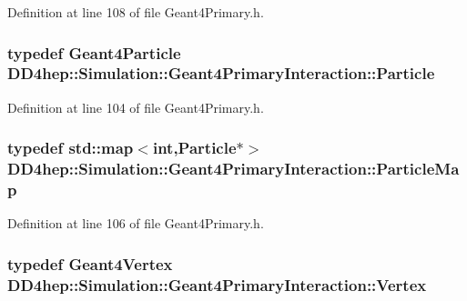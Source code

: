 Definition at line 108 of file Geant4Primary.h.\hypertarget{class_d_d4hep_1_1_simulation_1_1_geant4_primary_interaction_a5b651f0c428d71ffdac8cb38bc6f3513}{
\subsubsection[{Particle}]{\setlength{\rightskip}{0pt plus 5cm}typedef {\bf Geant4Particle} {\bf DD4hep::Simulation::Geant4PrimaryInteraction::Particle}}}
\label{class_d_d4hep_1_1_simulation_1_1_geant4_primary_interaction_a5b651f0c428d71ffdac8cb38bc6f3513}


Definition at line 104 of file Geant4Primary.h.\hypertarget{class_d_d4hep_1_1_simulation_1_1_geant4_primary_interaction_a6787a2c42dc1fd371b274e75dc380e92}{
\subsubsection[{ParticleMap}]{\setlength{\rightskip}{0pt plus 5cm}typedef std::map$<$int,{\bf Particle}$\ast$$>$ {\bf DD4hep::Simulation::Geant4PrimaryInteraction::ParticleMap}}}
\label{class_d_d4hep_1_1_simulation_1_1_geant4_primary_interaction_a6787a2c42dc1fd371b274e75dc380e92}


Definition at line 106 of file Geant4Primary.h.\hypertarget{class_d_d4hep_1_1_simulation_1_1_geant4_primary_interaction_a2577cfaf475b28c703eb8e0dce5cccde}{
\subsubsection[{Vertex}]{\setlength{\rightskip}{0pt plus 5cm}typedef {\bf Geant4Vertex} {\bf DD4hep::Simulation::Geant4PrimaryInteraction::Vertex}}}
\label{class_d_d4hep_1_1_simulation_1_1_geant4_primary_interaction_a2577cfaf475b28c703eb8e0dce5cccde}


